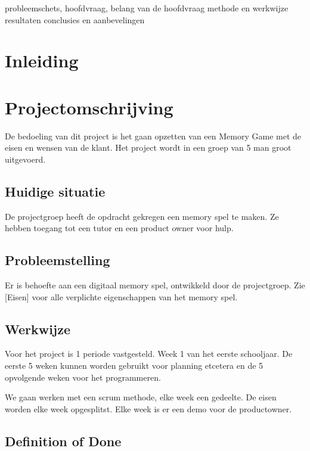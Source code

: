 \documentclass[a4paper,titlepage,11pt]{article}
\begin{document}
probleemschets, hoofdvraag, belang van de hoofdvraag
methode en werkwijze
resultaten
conclusies en aanbevelingen

\clearpage

\section{Inleiding}

\clearpage

\section{Projectomschrijving}

De bedoeling van dit project is het gaan opzetten van een Memory Game met de eisen en wensen van de klant. Het project wordt in een groep van 5 man groot uitgevoerd.

\subsection{Huidige situatie}

De projectgroep heeft de opdracht gekregen een memory spel te maken. Ze hebben toegang tot een tutor en een product owner voor hulp.

\subsection{Probleemstelling}

Er is behoefte aan een digitaal memory spel, ontwikkeld door de projectgroep. Zie [Eisen] voor alle verplichte eigenschappen van het memory spel.

\subsection{Werkwijze}

Voor het project is 1 periode vastgesteld. Week 1 van het eerste schooljaar. De eerste 5 weken kunnen worden gebruikt voor planning etcetera en de 5 opvolgende weken voor het programmeren.

We gaan werken met een scrum methode, elke week een gedeelte. De eisen worden elke week opgesplitst. Elke week is er een demo voor de productowner.

\subsection{Definition of Done}
\end{document}
